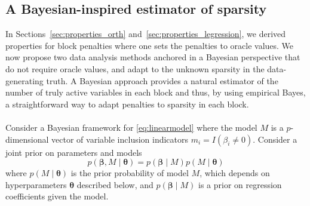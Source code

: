 \documentclass[aos]{imsart}
\theoremstyle{plain}
\newcommand{\bs}{\boldsymbol}
\begin{document}
\subsection{A Bayesian-inspired estimator of sparsity}

In Sections~\ref{sec:properties_orth} and~\ref{sec:properties_legression}, we derived properties for block penalties where one sets the penalties to oracle values.
We now
propose two data analysis methods anchored in a Bayesian perspective
that do not require oracle values, and adapt to the unknown sparsity in the data-generating truth.
A Bayesian approach provides a natural estimator of the number of truly active variables in each block and thus, by using empirical Bayes, a straightforward way to adapt penalties to sparsity in each block.
\\
\\
Consider a Bayesian framework for \eqref{eq:linearmodel} where
the model $M$ is a $p$-dimensional vector of variable inclusion indicators $m_i=I(\beta_i \neq 0)$. Consider a joint prior on parameters and models 
\begin{equation}\label{eq:bayesianframework}
    p(\boldsymbol{\beta},M \mid \boldsymbol{\theta})=p( \boldsymbol{\beta} \mid  M) p(M \mid \boldsymbol{\theta})
\end{equation}
where $p(M \mid \boldsymbol{\theta})$ is the prior probability of model $M$, which depends on hyperparameters $\bs \theta$ described below,
and $p( \boldsymbol{\beta} \mid  M)$ is a prior on regression coefficients given the model. 
\end{document}
